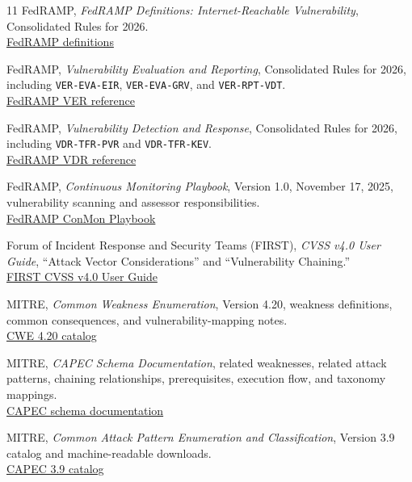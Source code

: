 \documentclass[11pt]{article}
\newcommand{\code}[1]{\texttt{#1}}
\begin{document}
\begin{thebibliography}{11}
FedRAMP, \emph{FedRAMP Definitions: Internet-Reachable Vulnerability},
Consolidated Rules for 2026.\\
\href{https://www.fedramp.gov/2026/definitions/}{FedRAMP definitions}

FedRAMP, \emph{Vulnerability Evaluation and Reporting}, Consolidated Rules
for 2026, including \code{VER-EVA-EIR}, \code{VER-EVA-GRV}, and
\code{VER-RPT-VDT}.\\
\href{https://www.fedramp.gov/2026/reference/rev5/b/vulnerability-evaluation-and-reporting/}{FedRAMP VER reference}

FedRAMP, \emph{Vulnerability Detection and Response}, Consolidated Rules for
2026, including \code{VDR-TFR-PVR} and \code{VDR-TFR-KEV}.\\
\href{https://www.fedramp.gov/2026/reference/rev5/d/vulnerability-detection-and-response/}{FedRAMP VDR reference}

FedRAMP, \emph{Continuous Monitoring Playbook}, Version 1.0, November 17,
2025, vulnerability scanning and assessor responsibilities.\\
\href{https://www.fedramp.gov/resources/documents/Continuous_Monitoring_Playbook.pdf}{FedRAMP ConMon Playbook}

Forum of Incident Response and Security Teams (FIRST), \emph{CVSS v4.0 User
Guide}, ``Attack Vector Considerations'' and ``Vulnerability Chaining.''\\
\href{https://www.first.org/cvss/user-guide.html}{FIRST CVSS v4.0 User Guide}

MITRE, \emph{Common Weakness Enumeration}, Version 4.20, weakness definitions,
common consequences, and vulnerability-mapping notes.\\
\href{https://cwe.mitre.org/data/downloads}{CWE 4.20 catalog}

MITRE, \emph{CAPEC Schema Documentation}, related weaknesses, related attack
patterns, chaining relationships, prerequisites, execution flow, and taxonomy
mappings.\\
\href{https://capec.mitre.org/documents/schema/schema_v3.0.html}{CAPEC schema documentation}

MITRE, \emph{Common Attack Pattern Enumeration and Classification}, Version
3.9 catalog and machine-readable downloads.\\
\href{https://capec.mitre.org/data/index.html}{CAPEC 3.9 catalog}


\end{thebibliography}
\end{document}
